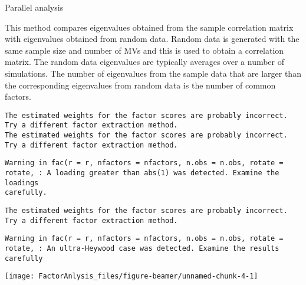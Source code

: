 \documentclass[10pt,ignorenonframetext,]{beamer}
\begin{document}
\begin{frame}[fragile]{Parallel analysis}

This method compares eigenvalues obtained from the sample correlation
matrix with eigenvalues obtained from random data. Random data is
generated with the same sample size and number of MVs and this is used
to obtain a correlation matrix. The random data eigenvalues are
typically averages over a number of simulations. The number of
eigenvalues from the sample data that are larger than the corresponding
eigenvalues from random data is the number of common factors.

\begin{verbatim}
The estimated weights for the factor scores are probably incorrect.  Try a different factor extraction method.
The estimated weights for the factor scores are probably incorrect.  Try a different factor extraction method.
\end{verbatim}

\begin{verbatim}
Warning in fac(r = r, nfactors = nfactors, n.obs = n.obs, rotate =
rotate, : A loading greater than abs(1) was detected. Examine the loadings
carefully.
\end{verbatim}

\begin{verbatim}
The estimated weights for the factor scores are probably incorrect.  Try a different factor extraction method.
\end{verbatim}

\begin{verbatim}
Warning in fac(r = r, nfactors = nfactors, n.obs = n.obs, rotate =
rotate, : An ultra-Heywood case was detected. Examine the results carefully
\end{verbatim}

\texttt{[image: FactorAnlysis\_files/figure-beamer/unnamed-chunk-4-1]}

\end{frame}
\end{document}
